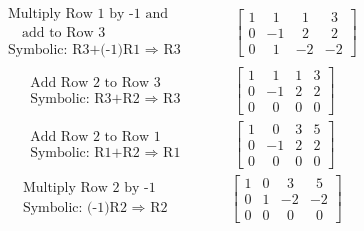 \documentclass[12pt]{book}
\theoremstyle{definition}
\begin{document}
\begin{eqnarray*}
\begin{array}{l}
\text{Multiply Row 1 by -1 and}\\
\text{~~~add to Row 3}\\
\text{Symbolic: R3+(-1)R1~}\Rightarrow \text{~R3}
\end{array}
&&
~~~~~~~~\left[
\begin{array}{ccc|c}
1 & ~~1 & ~~1 & ~~3\\
0 & -1 & ~~2 & ~~2\\
0 & ~~1 & -2 & -2
\end{array}
\right]
\end{eqnarray*}
\begin{eqnarray*}
\begin{array}{l}
\text{Add Row 2 to Row 3}\\
\text{Symbolic: R3+R2~}\Rightarrow \text{~R3}
\end{array}
&&
~~~~~~~~\left[
\begin{array}{ccc|c}
1 & ~~1 & 1 & 3\\
0 & -1 & 2 & 2\\
0 & ~~0 & 0 & 0
\end{array}
\right]
\end{eqnarray*}
\begin{eqnarray*}
\begin{array}{l}
\text{Add Row 2 to Row 1}\\
\text{Symbolic: R1+R2~}\Rightarrow \text{~R1}
\end{array}
&&
~~~~~~~~\left[
\begin{array}{ccc|c}
1 & ~~0 & 3 & 5\\
0 & -1 & 2 & 2\\
0 & ~~0 & 0 & 0
\end{array}
\right]
\end{eqnarray*}
\begin{eqnarray*}
\begin{array}{l}
\text{Multiply Row 2 by -1}\\
\text{Symbolic: (-1)R2~}\Rightarrow \text{~R2}
\end{array}
&&
~~~~~~~~~~~\left[
\begin{array}{ccc|c}
1 & 0 & ~~3 & ~~5\\
0 & 1 & -2 & -2\\
0 & 0 & ~~0 & ~~0
\end{array}
\right]
\end{eqnarray*}
\end{document}
